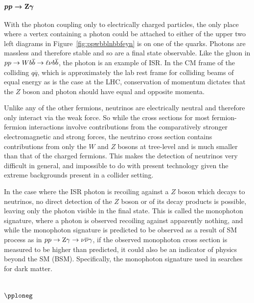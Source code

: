  \subsection[\ppzg]
 {$\boldsymbol{pp\rightarrow \mathrm{Z}\gamma}$}

 With the photon coupling only to 
  electrically charged particles,
  the only place where a vertex
  containing a photon could be attached to
  either of the upper two left diagrams
  in Figure~\ref{fig:ppwbblnbbfeyn}
  is on one of the quarks.
 Photons are massless and therefore stable
  and so are a final state observable.
 Like the gluon in $pp\rightarrow Wb\overline{b}\rightarrow\ell\nu b\overline{b}$,
  the photon is an example of ISR.
 In the CM frame of the colliding $q\overline{q}$,
  which is approximately the lab rest frame
  for colliding beams of equal energy as is the
  case at the LHC,
  conservation of momentum dictates
  that the $Z$ boson and photon should have 
  equal and opposite momenta.

 Unlike any of the other fermions, 
  neutrinos are electrically neutral
  and therefore only interact via
  the weak force. 
 So while the cross sections for
  most fermion-fermion interactions involve
  contributions from the comparatively stronger
  electromagnetic and strong forces,
  the neutrino cross section contains
  contributions from only the $W$ and $Z$
  bosons at tree-level and is
  much smaller than that of the charged fermions.
 This makes the detection of neutrinos very difficult in general,
  and impossible to do with present technology
  given the extreme backgrounds present
  in a collider setting.
  
 In the case where the ISR photon is recoiling
  against a $Z$ boson which decays
  to neutrinos, 
  no direct detection of the $Z$ boson or of
  its decay products is possible,
  leaving only the photon visible in the final state.
 This is called the monophoton signature,
  where a photon is observed recoiling against
  apparently nothing, and while the
  monophoton signature is predicted to be
  observed as a result of SM process as in $pp\rightarrow \mathrm{Z}\gamma\rightarrow\nu\overline{\nu}\gamma$,
  if the observed monophoton cross section is measured to be higher 
  than predicted, it could also be an indicator of physics beyond the SM (BSM).
 Specifically, the monophoton signature used in searches for dark matter.


 \section[Dark matter models of \pploneg]
 {$\boldsymbol{\pploneg}$}

